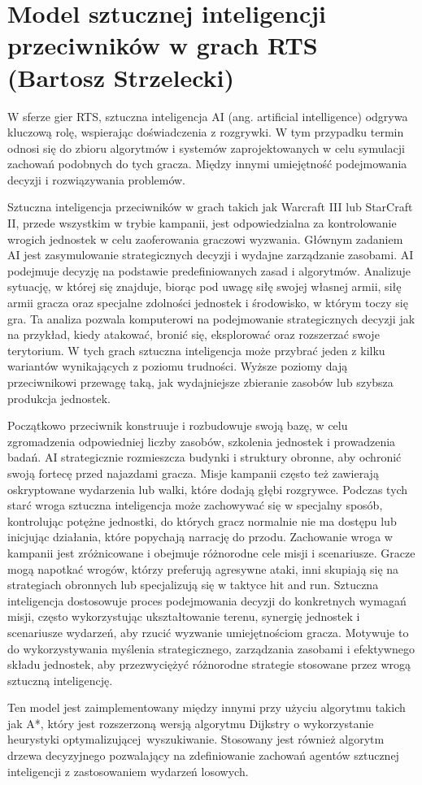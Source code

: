 \section{Model sztucznej inteligencji przeciwników w grach RTS (Bartosz Strzelecki)}
W sferze gier RTS, sztuczna inteligencja AI (ang. artificial intelligence) odgrywa kluczową rolę, wspierając doświadczenia z rozgrywki.
W tym przypadku termin odnosi się do zbioru algorytmów i systemów zaprojektowanych w celu symulacji
zachowań podobnych do tych gracza. Między innymi umiejętność podejmowania decyzji i rozwiązywania problemów.

Sztuczna inteligencja przeciwników w grach takich jak Warcraft III lub StarCraft II, przede wszystkim w trybie kampanii,
jest odpowiedzialna za kontrolowanie wrogich jednostek w celu zaoferowania graczowi wyzwania. Głównym zadaniem AI jest zasymulowanie
strategicznych decyzji i wydajne zarządzanie zasobami.
AI podejmuje decyzję na podstawie predefiniowanych zasad i algorytmów. Analizuje sytuację, w której się znajduje, biorąc pod uwagę
siłę swojej własnej armii, siłę armii gracza oraz specjalne zdolności jednostek i środowisko, w którym toczy się gra.
Ta analiza pozwala komputerowi na podejmowanie strategicznych decyzji jak na przykład, kiedy atakować, bronić się, eksplorować oraz rozszerzać swoje terytorium.
W tych grach sztuczna inteligencja może przybrać jeden z kilku wariantów wynikających z poziomu trudności. Wyższe poziomy
dają przeciwnikowi przewagę taką, jak wydajniejsze zbieranie zasobów lub szybsza produkcja jednostek.

Początkowo przeciwnik konstruuje i rozbudowuje swoją bazę, w celu zgromadzenia odpowiedniej liczby zasobów, szkolenia jednostek i prowadzenia badań.
AI strategicznie rozmieszcza budynki i struktury obronne, aby ochronić swoją fortecę przed najazdami gracza. 
Misje kampanii często też zawierają oskryptowane wydarzenia lub walki, które dodają głębi rozgrywce. Podczas tych starć wroga sztuczna inteligencja
może zachowywać się w specjalny sposób, kontrolując potężne jednostki, do których gracz normalnie nie ma dostępu lub inicjując działania, które popychają
narrację do przodu.
Zachowanie wroga w kampanii jest zróżnicowane i obejmuje różnorodne cele misji i scenariusze. Gracze mogą napotkać wrogów, którzy preferują agresywne ataki,
inni skupiają się na strategiach obronnych lub specjalizują się w taktyce hit and run. Sztuczna inteligencja dostosowuje proces podejmowania decyzji do
konkretnych wymagań misji, często wykorzystując ukształtowanie terenu, synergię jednostek i scenariusze wydarzeń, aby rzucić wyzwanie umiejętnościom gracza.
Motywuje to do wykorzystywania myślenia strategicznego, zarządzania zasobami i efektywnego składu jednostek, aby przezwyciężyć różnorodne strategie stosowane przez wrogą sztuczną inteligencję.

Ten model jest zaimplementowany między innymi przy użyciu algorytmu takich jak A*, który jest rozszerzoną wersją algorytmu Dijkstry o wykorzystanie heurystyki 
optymalizującej wyszukiwanie. Stosowany jest również algorytm drzewa decyzyjnego pozwalający na zdefiniowanie zachowań agentów sztucznej inteligencji z zastosowaniem wydarzeń losowych.
